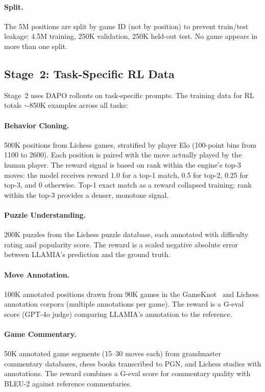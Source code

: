 \paragraph{Split.} The 5M positions are split by game ID (not by position) to prevent train/test leakage: 4.5M training, 250K validation, 250K held-out test. No game appears in more than one split.

\subsection{Stage~2: Task-Specific RL Data}
\label{sec:app_data_stage2}

Stage~2 uses DAPO rollouts on task-specific prompts. The training data for RL totals ${\sim}$850K examples across all tasks:

\paragraph{Behavior Cloning.} 500K positions from Lichess games, stratified by player Elo (100-point bins from 1100 to 2600). Each position is paired with the move actually played by the human player. The reward signal is based on rank within the engine's top-3 moves: the model receives reward 1.0 for a top-1 match, 0.5 for top-2, 0.25 for top-3, and 0 otherwise. Top-1 exact match as a reward collapsed training; rank within the top-3 provides a denser, monotone signal.

\paragraph{Puzzle Understanding.} 200K puzzles from the Lichess puzzle database, each annotated with difficulty rating and popularity score. The reward is a scaled negative absolute error between LLAMIA's prediction and the ground truth.

\paragraph{Move Annotation.} 100K annotated positions drawn from 90K games in the GameKnot~\cite{Gameknot} and Lichess annotation corpora (multiple annotations per game). The reward is a G-eval score (GPT-4o judge) comparing LLAMIA's annotation to the reference.

\paragraph{Game Commentary.} 50K annotated game segments (15--30 moves each) from grandmaster commentary databases, chess books transcribed to PGN, and Lichess studies with annotations. The reward combines a G-eval score for commentary quality with BLEU-2 against reference commentaries.

